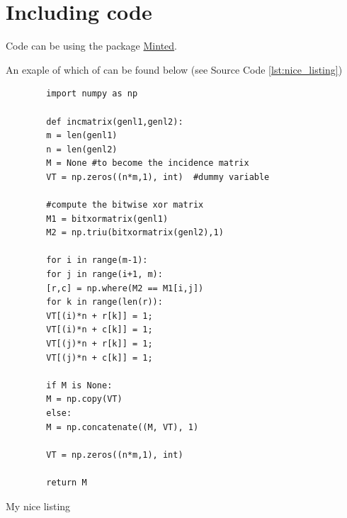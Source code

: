 \section{Including code}

Code can be using the package
\href{https://www.sharelatex.com/learn/Code\_Highlighting\_with\_minted}{Minted}.

An exaple of which of can be found below (see Source Code \ref{lst:nice_listing})
\begin{listing}
    \begin{verbatim}
        import numpy as np

        def incmatrix(genl1,genl2):
        m = len(genl1)
        n = len(genl2)
        M = None #to become the incidence matrix
        VT = np.zeros((n*m,1), int)  #dummy variable

        #compute the bitwise xor matrix
        M1 = bitxormatrix(genl1)
        M2 = np.triu(bitxormatrix(genl2),1)

        for i in range(m-1):
        for j in range(i+1, m):
        [r,c] = np.where(M2 == M1[i,j])
        for k in range(len(r)):
        VT[(i)*n + r[k]] = 1;
        VT[(i)*n + c[k]] = 1;
        VT[(j)*n + r[k]] = 1;
        VT[(j)*n + c[k]] = 1;

        if M is None:
        M = np.copy(VT)
        else:
        M = np.concatenate((M, VT), 1)

        VT = np.zeros((n*m,1), int)

        return M
    \end{verbatim}

    \caption{My nice listing}
    \label{lst:nice_listing}
\end{listing}
\fi